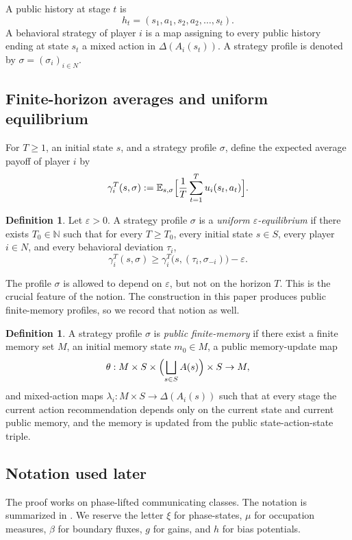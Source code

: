 \documentclass[12pt]{article}
\theoremstyle{definition}
\newtheorem{definition}[theorem]{Definition}
\newcommand{\eps}{\varepsilon}
\newcommand{\N}{\mathbb{N}}
\newcommand{\E}{\mathbb{E}}
\newcommand{\1}{\mathbf{1}}
\begin{document}
A public history at stage \(t\) is
\[
h_t=(s_1,a_1,s_2,a_2,\dots,s_t).
\]
A behavioral strategy of player \(i\) is a map assigning to every public history ending at
state \(s_t\) a mixed action in \(\Delta(A_i(s_t))\).  A strategy profile is denoted by
\(\sigma=(\sigma_i)_{i\in N}\).

\subsection{Finite-horizon averages and uniform equilibrium}

For \(T\ge 1\), an initial state \(s\), and a strategy profile \(\sigma\), define the
expected average payoff of player \(i\) by
\[
\gamma_i^T(s,\sigma)
:=
\E_{s,\sigma}\Bigl[\frac1T\sum_{t=1}^T u_i(s_t,a_t)\Bigr].
\]

\begin{definition}
Let \(\eps>0\).  A strategy profile \(\sigma\) is a \emph{uniform $\eps$-equilibrium} if
there exists \(T_0\in\N\) such that for every \(T\ge T_0\), every initial state \(s\in S\),
every player \(i\in N\), and every behavioral deviation \(\tau_i\),
\[
\gamma_i^T(s,\sigma)\ge
\gamma_i^T\bigl(s,(\tau_i,\sigma_{-i})\bigr)-\eps.
\]
\end{definition}

The profile \(\sigma\) is allowed to depend on \(\eps\), but not on the horizon \(T\).
This is the crucial feature of the notion.  The construction in this paper produces public
finite-memory profiles, so we record that notion as well.

\begin{definition}
A strategy profile \(\sigma\) is \emph{public finite-memory} if there exist a finite memory
set \(M\), an initial memory state \(m_0\in M\), a public memory-update map
\[
\theta:M\times S\times \Bigl(\bigsqcup_{s\in S}A(s)\Bigr)\times S\to M,
\]
and mixed-action maps \(\lambda_i:M\times S\to \Delta(A_i(s))\) such that at every stage
the current action recommendation depends only on the current state and current public
memory, and the memory is updated from the public state-action-state triple.
\end{definition}

\subsection{Notation used later}

The proof works on phase-lifted communicating classes.  The notation is summarized in
.  We reserve the letter \(\xi\) for phase-states, \(\mu\) for
occupation measures, \(\beta\) for boundary fluxes, \(g\) for gains, and \(h\) for bias
potentials.
\end{document}
